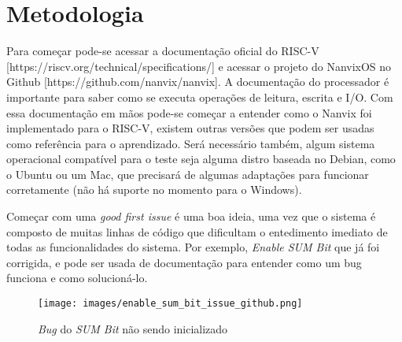 \section{Metodologia}

Para começar pode-se acessar a documentação oficial do RISC-V [https://riscv.org/technical/specifications/] 
e acessar o projeto do NanvixOS no Github [https://github.com/nanvix/nanvix]. A documentação do 
processador é importante para saber como se executa operações de leitura, escrita e I/O. 
Com essa documentação em mãos pode-se começar a entender como o Nanvix foi implementado para o 
RISC-V, existem outras versões que podem ser usadas como referência para o aprendizado. 
Será necessário também, algum sistema operacional compatível para o teste seja alguma 
distro baseada no Debian, como o Ubuntu ou um Mac, que precisará de algumas adaptações 
para funcionar corretamente (não há suporte no momento para o Windows). 

Começar com uma \emph{good first issue} é uma boa ideia, uma vez que o sistema é composto de muitas linhas de 
código que dificultam o entedimento imediato de todas as funcionalidades do sistema. 
Por exemplo, \emph{Enable SUM Bit} \cite{EnableSUMBit} que já foi corrigida, 
e pode ser usada de documentação para entender como um bug funciona e como solucioná-lo.

\begin{figure}[h!]
    \texttt{[image: images/enable\_sum\_bit\_issue\_github.png]}
    \caption{\emph{Bug} do \emph{SUM Bit} não sendo inicializado}
\end{figure}